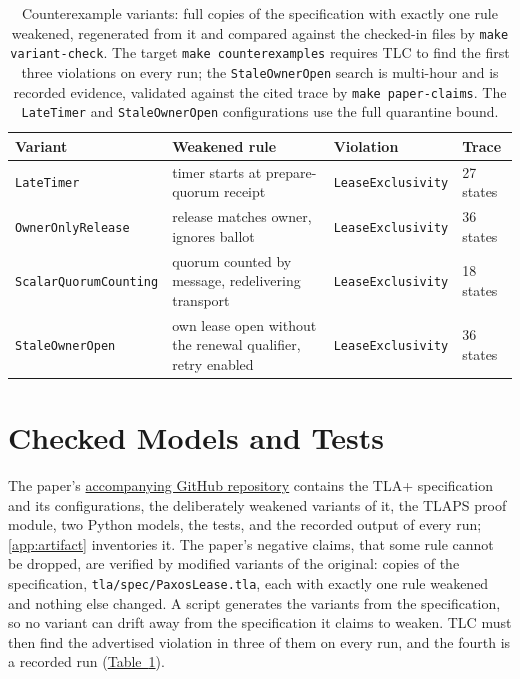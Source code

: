 \documentclass[final,5p,times,twocolumn,number]{elsarticle}
\newcommand{\code}[1]{\texttt{#1}}
\newcommand{\tabref}[1]{\hyperref[#1]{Table~\ref*{#1}}}
\begin{document}
\begin{table}[tbp]
\centering
\small
\renewcommand{\arraystretch}{1.35}
\begin{tabular}{llll}
\toprule
\textbf{Variant} & \textbf{Weakened rule} & \textbf{Violation} & \textbf{Trace} \\
\midrule[\heavyrulewidth]
\code{LateTimer} & timer starts at prepare-quorum receipt & \code{LeaseExclusivity} & 27 states \\
\hline
\code{OwnerOnlyRelease} & release matches owner, ignores ballot & \code{LeaseExclusivity} & 36 states \\
\hline
\code{ScalarQuorumCounting} & quorum counted by message, redelivering transport & \code{LeaseExclusivity} & 18 states \\
\hline
\code{StaleOwnerOpen} & own lease open without the renewal qualifier, retry enabled & \code{LeaseExclusivity} & 36 states \\
\bottomrule
\end{tabular}
\caption{\label{tab:variants}Counterexample variants: full copies of the specification with exactly one rule weakened, regenerated from it and compared against the checked-in files by \code{make variant-check}.  The target \code{make counterexamples} requires TLC to find the first three violations on every run; the \code{StaleOwnerOpen} search is multi-hour and is recorded evidence, validated against the cited trace by \code{make paper-claims}.  The \code{LateTimer} and \code{StaleOwnerOpen} configurations use the full quarantine bound.}
\end{table}

\section{Checked Models and Tests}\label{sec:checked}

The paper's \href{https://github.com/mtrencseni/paxoslease-revisited-2026}{accompanying GitHub repository} contains the TLA+ specification and its configurations, the deliberately weakened variants of it, the TLAPS proof module, two Python models, the tests, and the recorded output of every run; \ref{app:artifact} inventories it.  The paper's negative claims, that some rule cannot be dropped, are verified by modified variants of the original: copies of the specification, \code{tla/spec/PaxosLease.tla}, each with exactly one rule weakened and nothing else changed.  A script generates the variants from the specification, so no variant can drift away from the specification it claims to weaken.  TLC must then find the advertised violation in three of them on every run, and the fourth is a recorded run (\tabref{tab:variants}).
\end{document}
